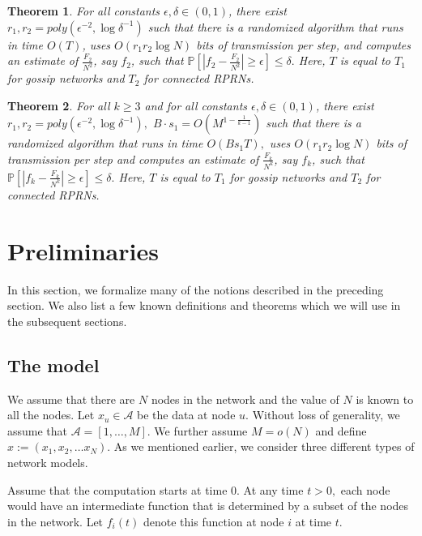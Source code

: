 \documentclass[10pt,twosided,a4paper,draft,onecolumn]{article}
\newcommand{\prob}[1]{\mathbb{P}\left[ #1 \right]}
\newtheorem{theorem}{Theorem}
\begin{document}
\begin{theorem}
\label{thm:main}
For all constants $\epsilon, \delta \in (0,1)$, there
exist $r_1,r_2 = poly(\epsilon^{-2}, \log \delta^{-1})$ such that there is
 a randomized algorithm that runs in time $O(T)$, uses $O(r_1r_2\log N)$ bits of
transmission per step, and computes an estimate of
$\frac{F_2}{N^2}$, say $f_{2}$, such that $\prob{ |f_2 -
  \frac{F_2}{N^2}| \geq \epsilon} \leq \delta.$ Here, $T$ is equal to
$T_1$ for gossip networks and $T_2$ for connected RPRNs.

\end{theorem}

\begin{theorem}
\label{thm:Fk}
For all $k \geq 3$ and for all constants $\epsilon, \delta \in (0,1)$,
there exist $r_1,r_2 = poly(\epsilon^{-2}, \log \delta^{-1}),$ $B\cdot s_1 = O(M^{1-\frac{1}{k-1}})$
such that there is a randomized algorithm that runs in time $O(Bs_1T),$ uses $O(r_1r_2\log N)$ bits of transmission per step
and computes an estimate of $\frac{F_k}{N^k}$, say ${f}_{k}$, such that\\
$\prob{ |f_k - \frac{F_k}{N^k}| \geq \epsilon} \leq \delta.$ Here, $T$
is equal to $T_1$ for gossip networks and $T_2$ for connected
RPRNs.

\end{theorem}


\section{Preliminaries}
\label{sec:prem}
In this section, we formalize many of the notions described in the
preceding section. We also list a few known definitions and theorems
which we will use in the subsequent sections.
\subsection{The model}
\label{sec:model}

We assume that there are $N$ nodes in the network and the value of $N$
is known to all the nodes. Let $x_u \in \mathcal{A}$ be the data at
node $u.$ Without loss of generality, we assume that $\mathcal{A} =
[1,\ldots, M].$ We further assume $M=o(N)$ and define $x:=(x_1,x_2,
\ldots x_N).$ As we mentioned earlier, we consider three different
types of network models.

Assume that the computation starts at time $0.$ At any time $t > 0,$
each node would have an intermediate function that is determined by a
subset of the nodes in the network. Let $f_i(t)$ denote this function
at node $i$ at time $t.$ 
\end{document}
